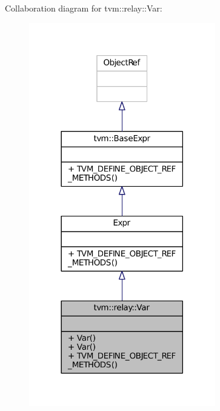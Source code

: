 Collaboration diagram for tvm\+:\+:relay\+:\+:Var\+:
\nopagebreak
\begin{figure}[H]
\begin{center}
\leavevmode
\includegraphics[width=230pt]{classtvm_1_1relay_1_1Var__coll__graph}
\end{center}
\end{figure}

